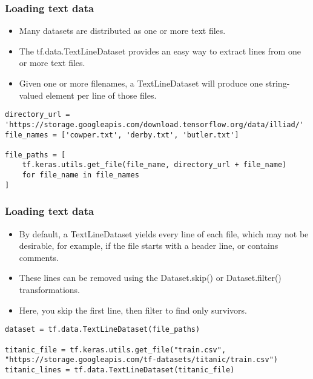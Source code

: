 \begin{frame}[fragile]\frametitle{Loading text data}

\begin{itemize}
\item Many datasets are distributed as one or more text files. 
\item The tf.data.TextLineDataset provides an easy way to extract lines from one or more text files. 
\item Given one or more filenames, a TextLineDataset will produce one string-valued element per line of those files.
\end{itemize}


\begin{lstlisting}
directory_url = 'https://storage.googleapis.com/download.tensorflow.org/data/illiad/'
file_names = ['cowper.txt', 'derby.txt', 'butler.txt']

file_paths = [
    tf.keras.utils.get_file(file_name, directory_url + file_name)
    for file_name in file_names
]

\end{lstlisting}
\end{frame}

\begin{frame}[fragile]\frametitle{Loading text data}

\begin{itemize}
\item By default, a TextLineDataset yields every line of each file, which may not be desirable, for example, if the file starts with a header line, or contains comments. \item These lines can be removed using the Dataset.skip() or Dataset.filter() transformations. 
\item Here, you skip the first line, then filter to find only survivors.
\end{itemize}


\begin{lstlisting}
dataset = tf.data.TextLineDataset(file_paths)

titanic_file = tf.keras.utils.get_file("train.csv", "https://storage.googleapis.com/tf-datasets/titanic/train.csv")
titanic_lines = tf.data.TextLineDataset(titanic_file)
\end{lstlisting}
\end{frame}


